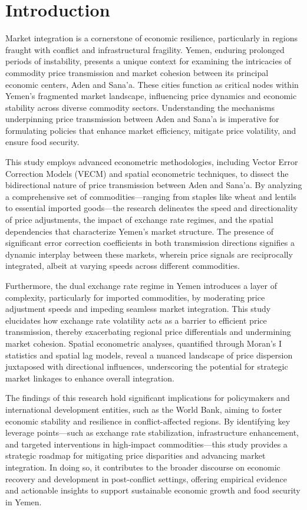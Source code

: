 \section{Introduction}
\small  %
\setlength{\parskip}{0.3em}  %

Market integration is a cornerstone of economic resilience, particularly in regions fraught with conflict and infrastructural fragility. Yemen, enduring prolonged periods of instability, presents a unique context for examining the intricacies of commodity price transmission and market cohesion between its principal economic centers, Aden and Sana’a. These cities function as critical nodes within Yemen’s fragmented market landscape, influencing price dynamics and economic stability across diverse commodity sectors. Understanding the mechanisms underpinning price transmission between Aden and Sana’a is imperative for formulating policies that enhance market efficiency, mitigate price volatility, and ensure food security.

This study employs advanced econometric methodologies, including Vector Error Correction Models (VECM) and spatial econometric techniques, to dissect the bidirectional nature of price transmission between Aden and Sana’a. By analyzing a comprehensive set of commodities—ranging from staples like wheat and lentils to essential imported goods—the research delineates the speed and directionality of price adjustments, the impact of exchange rate regimes, and the spatial dependencies that characterize Yemen’s market structure. The presence of significant error correction coefficients in both transmission directions signifies a dynamic interplay between these markets, wherein price signals are reciprocally integrated, albeit at varying speeds across different commodities.

Furthermore, the dual exchange rate regime in Yemen introduces a layer of complexity, particularly for imported commodities, by moderating price adjustment speeds and impeding seamless market integration. This study elucidates how exchange rate volatility acts as a barrier to efficient price transmission, thereby exacerbating regional price differentials and undermining market cohesion. Spatial econometric analyses, quantified through Moran’s I statistics and spatial lag models, reveal a nuanced landscape of price dispersion juxtaposed with directional influences, underscoring the potential for strategic market linkages to enhance overall integration.

The findings of this research hold significant implications for policymakers and international development entities, such as the World Bank, aiming to foster economic stability and resilience in conflict-affected regions. By identifying key leverage points—such as exchange rate stabilization, infrastructure enhancement, and targeted interventions in high-impact commodities—this study provides a strategic roadmap for mitigating price disparities and advancing market integration. In doing so, it contributes to the broader discourse on economic recovery and development in post-conflict settings, offering empirical evidence and actionable insights to support sustainable economic growth and food security in Yemen.
